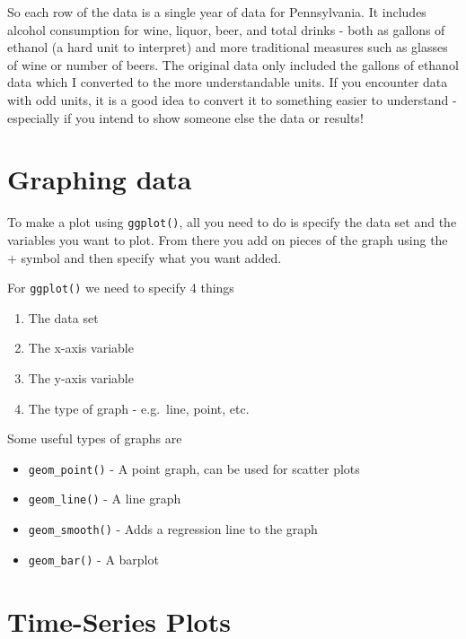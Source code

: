 \documentclass[
  12pt,
]{book}
\providecommand{\tightlist}{%
  \setlength{\itemsep}{0pt}\setlength{\parskip}{0pt}}
\begin{document}
So each row of the data is a single year of data for Pennsylvania. It includes alcohol consumption for wine, liquor, beer, and total drinks - both as gallons of ethanol (a hard unit to interpret) and more traditional measures such as glasses of wine or number of beers. The original data only included the gallons of ethanol data which I converted to the more understandable units. If you encounter data with odd units, it is a good idea to convert it to something easier to understand - especially if you intend to show someone else the data or results!

\hypertarget{graphing-data}{%
\section{Graphing data}\label{graphing-data}}

To make a plot using \texttt{ggplot()}, all you need to do is specify the data set and the variables you want to plot. From there you add on pieces of the graph using the + symbol and then specify what you want added.

For \texttt{ggplot()} we need to specify 4 things

\begin{enumerate}
\def\labelenumi{\arabic{enumi}.}
\tightlist
\item
  The data set
\item
  The x-axis variable
\item
  The y-axis variable
\item
  The type of graph - e.g.~line, point, etc.
\end{enumerate}

Some useful types of graphs are

\begin{itemize}
\tightlist
\item
  \texttt{geom\_point()} - A point graph, can be used for scatter plots
\item
  \texttt{geom\_line()} - A line graph
\item
  \texttt{geom\_smooth()} - Adds a regression line to the graph
\item
  \texttt{geom\_bar()} - A barplot
\end{itemize}

\hypertarget{time-series-plots}{%
\section{Time-Series Plots}\label{time-series-plots}}
\end{document}
